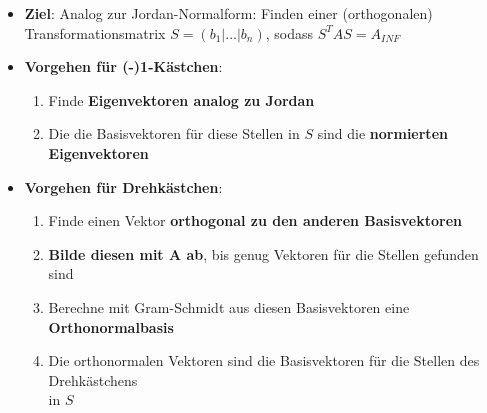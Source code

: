 \begin{itemize}
	\item \textbf{Ziel}: Analog zur Jordan-Normalform: Finden einer (orthogonalen) Transformationsmatrix $S = (b_1 | \dots | b_n)$, sodass $S^TAS = A_{INF}$
	\item \textbf{Vorgehen für (-)1-Kästchen}:
	\begin{enumerate}
		\item Finde \textbf{Eigenvektoren analog zu Jordan}
		\item Die die Basisvektoren für diese Stellen in $S$ sind die \textbf{normierten Eigenvektoren}
	\end{enumerate}
	\item \textbf{Vorgehen für Drehkästchen}:
	\begin{enumerate}
		\item Finde einen Vektor \textbf{orthogonal zu den anderen Basisvektoren}
		\item \textbf{Bilde diesen mit A ab}, bis genug Vektoren für die Stellen gefunden sind
		\item Berechne mit Gram-Schmidt aus diesen Basisvektoren eine \textbf{Orthonormalbasis}
		\item Die orthonormalen Vektoren sind die Basisvektoren für die Stellen des Drehkästchens\\in $S$
	\end{enumerate}
\end{itemize}